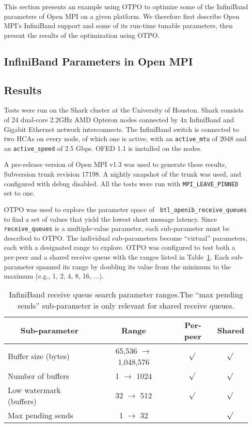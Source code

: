 This section presents an example using OTPO to optimize some of the
InfiniBand parameters of Open MPI on a given platform.  We therefore
first describe Open MPI's InfiniBand support and some of its run-time
tunable parameters, then present the results of the optimization using
OTPO.

\subsection{InfiniBand Parameters in Open MPI}



\subsection{Results}

Tests were run on the Shark cluster at the University of Houston.
Shark consists of 24 dual-core 2.2GHz AMD Opteron nodes connected by
4x InfiniBand and Gigabit Ethernet network interconnects.  
The InfiniBand switch is connected to two HCAs on every node, of which one is
active, with an {\tt active\_mtu} of 2048 and an {\tt active\_speed} of 2.5
Gbps. OFED 1.1 is installed on the nodes. 

A pre-release version of Open MPI v1.3 was used to generate these
results, Subversion trunk revision 17198. A nightly snapshot of the trunk was
used, and configured with debug disabled. All the tests were run with
{\tt MPI\_LEAVE\_PINNED} set to one.

OTPO was used to explore the parameter space of {\tt
  btl\_\-openib\_\-receive\_\-queues} to find a set of values that
yield the lowest short message latency.  Since {\tt receive\_\-queues}
is a multiple-value parameter, each sub-parameter must be described to
OTPO.  The individual sub-parameters become ``virtual'' parameters,
each with a designated range to explore.  OTPO was configured to test
both a per-peer and a shared receive queue with the ranges listed in
Table~\ref{table:eval-queue-search-params}.  Each sub-parameter
spanned its range by doubling its value from the minimum to the
maximum (e.g., 1, 2, 4, 8, 16, ...).

\def\yes{$\sqrt{}$}

\begin{table}[tb]
\centering
\caption{InfiniBand receive queue search parameter ranges.The ``max
  pending sends'' sub-parameter is only relevant for shared receive
  queues.}
\label{table:eval-queue-search-params} 
\begin{tabular}{|l|c|c|c|} 
\multicolumn{1}{c}{Sub-parameter} &
\multicolumn{1}{c}{Range} &
\multicolumn{1}{c}{Per-peer} &
\multicolumn{1}{c}{Shared} \\
\hline
Buffer size (bytes) & 65,536 $\rightarrow$ 1,048,576 & \yes & \yes \\
Number of buffers & 1 $\rightarrow$ 1024 & \yes & \yes \\
Low watermark (buffers) & 32 $\rightarrow$ 512  & \yes & \yes \\
Max pending sends & 1 $\rightarrow$ 32 & & \yes \\
\hline
\end{tabular}
\end{table}

